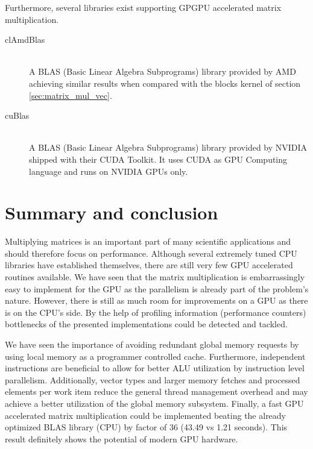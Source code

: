 Furthermore, several libraries exist supporting GPGPU accelerated matrix multiplication.

\begin{description}
   \item[clAmdBlas \cite{cl_amd_blas}] \hfill \\
   A BLAS (Basic Linear Algebra Subprograms) library provided by AMD achieving similar results when compared with the blocks kernel of section \ref{sec:matrix_mul_vec}. 
   \item[cuBlas \cite{cublas}] \hfill \\
   A BLAS (Basic Linear Algebra Subprograms) library provided by NVIDIA shipped with their CUDA Toolkit. It uses CUDA as GPU Computing language and runs on NVIDIA GPUs only.
\end{description}

\section{Summary and conclusion}
Multiplying matrices is an important part of many scientific applications and should therefore focus on performance. Although several extremely tuned CPU libraries have established themselves, there are still very few GPU accelerated routines available. We have seen that the matrix multiplication is embarrassingly easy to implement for the GPU as the parallelism is already part of the problem's nature. However, there is still as much room for improvements on a GPU as there is on the CPU's side. By the help of profiling information (performance counters) bottlenecks of the presented implementations could be detected and tackled.

We have seen the importance of avoiding redundant global memory requests by using local memory as a programmer controlled cache. Furthermore, independent instructions are beneficial to allow for better ALU utilization by instruction level parallelism. Additionally, vector types and larger memory fetches and processed elements per work item reduce the general thread management overhead and may achieve a better utilization of the global memory subsystem. Finally, a fast GPU accelerated matrix multiplication could be implemented beating the already optimized BLAS library (CPU) by factor of 36 (43.49 vs 1.21 seconds). This result definitely shows the potential of modern GPU hardware.
